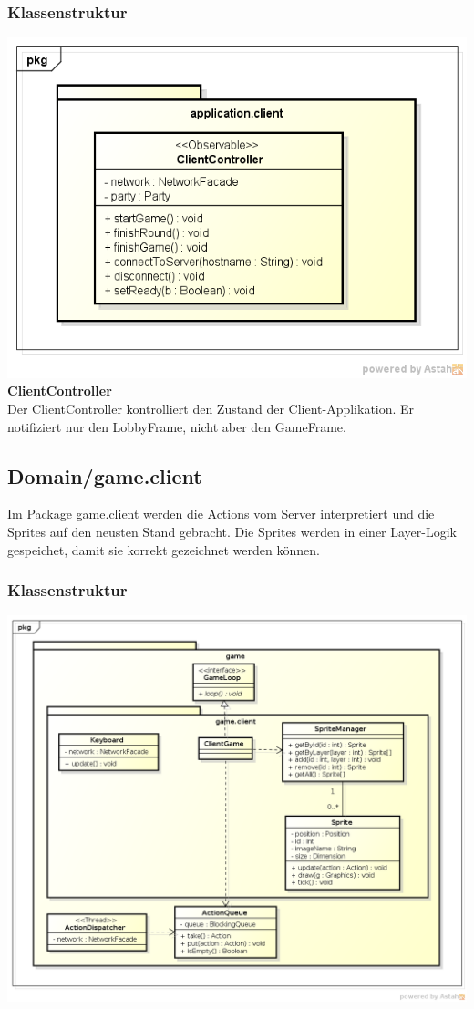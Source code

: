 \documentclass[11pt]{scrartcl}
\begin{document}
\subsubsection{Klassenstruktur}
\includegraphics[scale=0.75]{ClassDiagramApplicationClient}\\
\textbf{ClientController}\\
Der ClientController kontrolliert den Zustand der Client-Applikation. Er notifiziert nur den LobbyFrame, nicht aber den GameFrame.\\



\newpage
\subsection{Domain/game.client}
Im Package game.client werden die Actions vom Server interpretiert und die Sprites auf den neusten Stand gebracht. Die Sprites werden in einer Layer-Logik gespeichet, damit sie korrekt gezeichnet werden können.

\subsubsection{Klassenstruktur}
\includegraphics[scale=0.5]{ClassDiagramGameClient}
\end{document}

